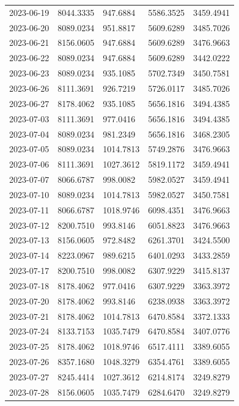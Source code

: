 \begin{footnotesize}
\begin{longtable}{lllll}
2023-06-19 & 8044.3335 & 947.6884 & 5586.3525 & 3459.4941 \\
2023-06-20 & 8089.0234 & 951.8817 & 5609.6289 & 3485.7026 \\
2023-06-21 & 8156.0605 & 947.6884 & 5609.6289 & 3476.9663 \\
2023-06-22 & 8089.0234 & 947.6884 & 5609.6289 & 3442.0222 \\
2023-06-23 & 8089.0234 & 935.1085 & 5702.7349 & 3450.7581 \\
2023-06-26 & 8111.3691 & 926.7219 & 5726.0117 & 3485.7026 \\
2023-06-27 & 8178.4062 & 935.1085 & 5656.1816 & 3494.4385 \\
2023-07-03 & 8111.3691 & 977.0416 & 5656.1816 & 3494.4385 \\
2023-07-04 & 8089.0234 & 981.2349 & 5656.1816 & 3468.2305 \\
2023-07-05 & 8089.0234 & 1014.7813 & 5749.2876 & 3476.9663 \\
2023-07-06 & 8111.3691 & 1027.3612 & 5819.1172 & 3459.4941 \\
2023-07-07 & 8066.6787 & 998.0082 & 5982.0527 & 3459.4941 \\
2023-07-10 & 8089.0234 & 1014.7813 & 5982.0527 & 3450.7581 \\
2023-07-11 & 8066.6787 & 1018.9746 & 6098.4351 & 3476.9663 \\
2023-07-12 & 8200.7510 & 993.8146 & 6051.8823 & 3476.9663 \\
2023-07-13 & 8156.0605 & 972.8482 & 6261.3701 & 3424.5500 \\
2023-07-14 & 8223.0967 & 989.6215 & 6401.0293 & 3433.2859 \\
2023-07-17 & 8200.7510 & 998.0082 & 6307.9229 & 3415.8137 \\
2023-07-18 & 8178.4062 & 977.0416 & 6307.9229 & 3363.3972 \\
2023-07-20 & 8178.4062 & 993.8146 & 6238.0938 & 3363.3972 \\
2023-07-21 & 8178.4062 & 1014.7813 & 6470.8584 & 3372.1333 \\
2023-07-24 & 8133.7153 & 1035.7479 & 6470.8584 & 3407.0776 \\
2023-07-25 & 8178.4062 & 1018.9746 & 6517.4111 & 3389.6055 \\
2023-07-26 & 8357.1680 & 1048.3279 & 6354.4761 & 3389.6055 \\
2023-07-27 & 8245.4414 & 1027.3612 & 6214.8174 & 3249.8279 \\
2023-07-28 & 8156.0605 & 1035.7479 & 6284.6470 & 3249.8279 \\

\end{longtable}
\end{footnotesize}
